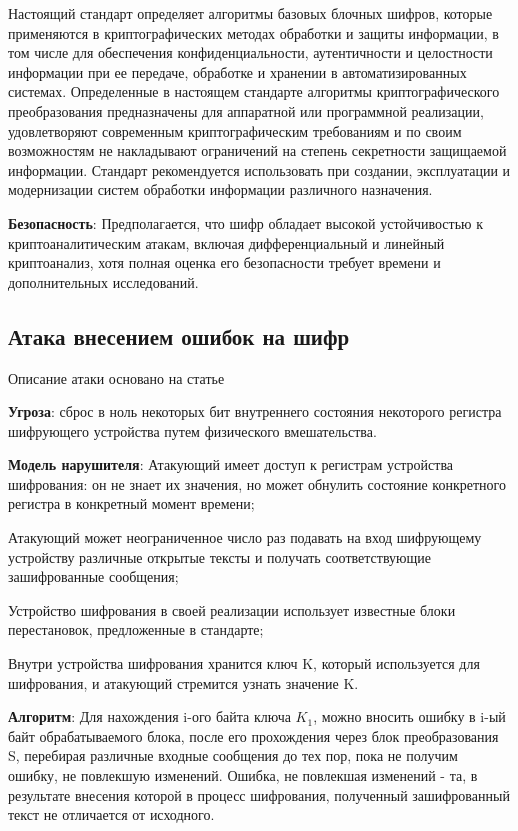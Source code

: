 \documentclass[colorthm]{../civarticle}
\begin{document}
Настоящий стандарт определяет алгоритмы базовых блочных шифров, которые применяются
в криптографических методах обработки и защиты информации, в том числе для обеспечения конфиденциальности, аутентичности и целостности информации при ее передаче, обработке и хранении в автоматизированных системах.
Определенные в настоящем стандарте алгоритмы криптографического преобразования предназначены для аппаратной или программной реализации, удовлетворяют современным криптографическим требованиям и по своим возможностям не накладывают ограничений на степень секретности защищаемой информации.
Стандарт рекомендуется использовать при создании, эксплуатации и модернизации систем обработки информации различного назначения.

\textbf{Безопасность}: Предполагается, что шифр обладает высокой устойчивостью к криптоаналитическим атакам, включая дифференциальный и линейный криптоанализ, хотя полная оценка его безопасности требует времени и дополнительных исследований.

\subsection{Атака внесением ошибок на шифр}
Описание атаки основано на статье ~\cite{atack1}

\textbf{Угроза}: сброс в ноль некоторых бит внутреннего состояния некоторого регистра шифрующего устройства путем физического вмешательства.

\textbf{Модель нарушителя}: 
Атакующий имеет доступ к регистрам устройства шифрования: он не знает их значения, но может обнулить состояние конкретного регистра в конкретный момент времени;

Атакующий может неограниченное число раз подавать на вход шифрующему устройству различные открытые тексты и получать соответствующие зашифрованные сообщения;

Устройство шифрования в своей реализации использует известные блоки перестановок, предложенные в стандарте;

Внутри устройства шифрования хранится ключ K, который используется для шифрования, и атакующий стремится узнать значение K.

\textbf{Алгоритм}: Для нахождения i-ого байта ключа $K_1$, можно вносить ошибку в i-ый
байт обрабатываемого блока, после его прохождения через блок преобразования S, перебирая различные входные сообщения до тех пор, пока не получим ошибку, не повлекшую изменений. Ошибка, не повлекшая изменений - та, в результате внесения
которой в процесс шифрования, полученный зашифрованный текст не отличается от исходного.
\end{document}
